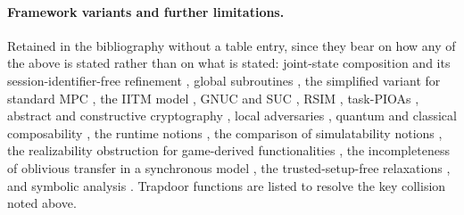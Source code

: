 \documentclass[11pt,a4paper]{article}
\begin{document}
\paragraph{Framework variants and further limitations.}
Retained in the bibliography without a table entry, since they bear on how any
of the above is stated rather than on what is stated: joint-state composition
\cite{cr03,kt08} and its session-identifier-free refinement
\cite{kt11ccs,blr04}, global subroutines \cite{bchtz20}, the simplified variant
for standard MPC \cite{ccl15}, the IITM model \cite{k06,kt13}, GNUC \cite{hs11}
and SUC \cite{w16}, RSIM \cite{bpw07}, task-PIOAs \cite{cckllps06}, abstract and
constructive cryptography \cite{mr11,maurer11}, local adversaries \cite{cv12},
quantum and classical composability \cite{bm04}, the runtime notions
\cite{hmqu05}, the comparison of simulatability notions \cite{kdmr08}, the
realizability obstruction for game-derived functionalities \cite{ddmrs06}, the
incompleteness of oblivious transfer in a synchronous model \cite{hm04a}, the
trusted-setup-free relaxations \cite{ps04,bs05}, and symbolic analysis
\cite{ch06}. Trapdoor functions \cite{y82a} are listed to resolve the key
collision noted above.

\end{document}
